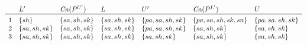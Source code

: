 \documentclass{article}
\begin{document}
\[
\begin{array}{c@{\hspace{10pt}}llllll}
& L' & \mathit{Cn}(P^{U'}) & L
& U' & \mathit{Cn}(P^{L'}) & U \\\hline\\[-3mm]
1 & \{sh\} & \{sa,sh,sk\} & \{sa,sh,sk\} & \{pa,sa,sh,sk\} & \{pa,sa,sh,sk,sn\} & \{pa,sa,sh,sk\} \\ 
2 & \{sa,sh,sk\} & \{sa,sh,sk\} & \{sa,sh,sk\} & \{pa,sa,sh,sk\} & \{sa,sh,sk\} & \{sa,sh,sk\} \\ 
3 & \{sa,sh,sk\} & \{sa,sh,sk\} & \{sa,sh,sk\} & \{sa,sh,sk\} & \{sa,sh,sk\} & \{sa,sh,sk\} \\ 
\end{array}
\]
\end{document}
